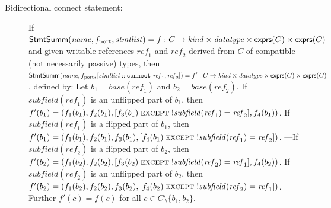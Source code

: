 \documentclass[a4paper]{article}
\newcommand{\stmtsem}{\mathsf{StmtSumm}}
\newcommand{\expressions}{\mathsf{exprs}}
\newcommand{\rconslist}[2]{[#1 \mathbin{::} #2]}
\begin{document}
\begin{description}
\item[Bidirectional connect statement:]
	If $\stmtsem(\mathit{name}, \linebreak[0] f_\mathrm{port}, \linebreak[0] \mathit{stmtlist}) = f: C \to \mathit{kind} \times \mathit{datatype} \times \expressions(C) \times \expressions(C)$
	and given writable references $\mathit{ref}_1$ and $\mathit{ref}_2$ derived from $C$ of compatible (not necessarily passive) types,
	then $\stmtsem(\mathit{name}, \linebreak[0] f_\mathrm{port}, \linebreak[0] \rconslist{\mathit{stmtlist}}{\linebreak[0] \mathtt{connect~} \mathit{ref}_1, \linebreak[0] \mathit{ref}_2}) = f': C \to \mathit{kind} \times \mathit{datatype} \times \expressions(C) \times \expressions(C)$,
	defined by:
	Let $b_1 = \mathit{base}(\mathit{ref}_1)$ and $b_2 = \mathit{base}(\mathit{ref}_2)$.
	If $\mathit{subfield}(\mathit{ref}_1)$ is an unflipped part of $b_1$, then $f'(b_1) = (f_1(b_1), \linebreak[0] f_2(b_1), \linebreak[0] [f_3(b_1) \mathrel{\textsc{except}} \mathord{!}\mathit{subfield}(\mathit{ref}_1) = \mathit{ref}_2], f_4(b_1))$.
	If $\mathit{subfield}(\mathit{ref}_1)$ is a    flipped part of $b_1$, then $f'(b_1) = (f_1(b_1), \linebreak[0] f_2(b_1), \linebreak[0] f_3(b_1), \linebreak[0] [f_4(b_1) \mathrel{\textsc{except}} \mathord{!}\mathit{subfield}(\mathit{ref}_1) = \mathit{ref}_2])$.%
	---If $\mathit{subfield}(\mathit{ref}_2)$ is a    flipped part of $b_2$, then $f'(b_2) = (f_1(b_2), \linebreak[0] f_2(b_2), \linebreak[0] [f_3(b_2) \mathrel{\textsc{except}} \mathord{!}\mathit{subfield}(\mathit{ref}_2) = \mathit{ref}_1], f_4(b_2))$.
	If $\mathit{subfield}(\mathit{ref}_2)$ is an unflipped part of $b_2$, then $f'(b_2) = (f_1(b_2), \linebreak[0] f_2(b_2), \linebreak[0] f_3(b_2), \linebreak[0] [f_4(b_2) \mathrel{\textsc{except}} \mathord{!}\mathit{subfield}(\mathit{ref}_2) = \mathit{ref}_1])$.
	Further $f'(c) = f(c)$ for all $c \in C \setminus \{ b_1, b_2 \}$.


\end{description}
\end{document}
